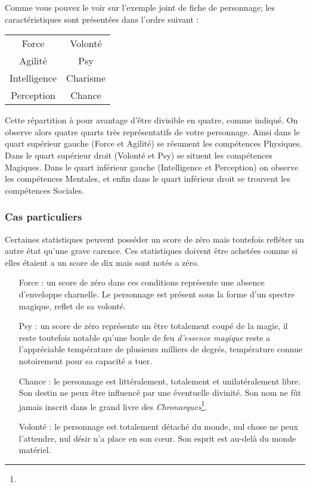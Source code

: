 Comme vous pouvez le voir sur l’exemple joint de fiche de personnage; 
les caractéristiques sont présentées dans l’ordre suivant :
\begin{center}
\begin{tabular}{c|c}
    Force &Volonté \\
    Agilité & Psy \\
    \hline
    Intelligence & Charisme\\
    Perception & Chance
\end{tabular}
\end{center}
Cette répartition à pour avantage d’être divisible en quatre, comme indiqué. On observe alors quatre quarts très représentatifs de votre personnage. Ainsi dans le quart supérieur gauche (Force et Agilité) se résument les compétences Physiques. 
Dans le quart supérieur droit (Volonté et Psy) se situent les compétences Magiques. Dans le quart inférieur gauche (Intelligence et Perception) on observe les compétences Mentales, 
et enfin dans le quart inférieur droit se trouvent les compétences Sociales.

\subsubsection{Cas particuliers}
Certaines statistiques peuvent posséder un score de zéro mais toutefois refléter un autre état qu'une grave carence.
Ces statistiques doivent être achetées comme si elles étaient a un score de dix mais sont notés a zéro.
\begin{itemize}
    \item[Force :] un score de zéro dans ces conditions représente une absence d'enveloppe charnelle. Le personnage est présent sous la forme d'un spectre magique, reflet de sa volonté.
    \item[Psy :] un score de zéro représente un être totalement coupé de la magie, il reste toutefois notable qu'une boule de feu {\em d'essence magique} reste a l'appréciable température de plusieurs milliers de degrés, température connue notoirement pour sa capacité a tuer. 
    \item[Chance :] le personnage est littéralement, totalement et unilatéralement libre. Son destin ne peux être influencé par une éventuelle divinité. Son nom ne fût jamais inscrit dans le grand livre des {\em Chronarques}\footnote{}.
    \item[Volonté :] le personnage est totalement détaché du monde, nul chose ne peux l'attendre, nul désir n'a place en son cœur. Son esprit est au-delà du monde matériel.
\end{itemize}
